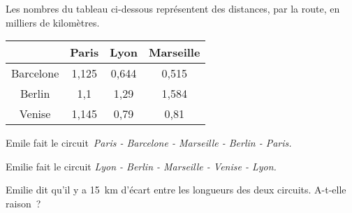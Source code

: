 Les nombres du tableau ci-dessous représentent des distances, par la
route, en milliers de kilomètres.
\begin{center}
  \begin{tabular}{|c|c|c|c|}
    \cline{2-4}
    \multicolumn{1}{c|}{}&Paris&Lyon&Marseille\\
    \hline
    Barcelone&1,125&0,644&0,515\\
    \hline
    Berlin&1,1&1,29&1,584\\
    \hline
    Venise&1,145&0,79&0,81\\
    \hline
  \end{tabular}
\end{center}
Emile fait le circuit {\em Paris - Barcelone - Marseille - Berlin -
Paris.}
\par Emilie fait le circuit {\em Lyon - Berlin - Marseille - Venise -
Lyon.}
\par Emilie dit qu'il y a 15~km d'écart entre les longueurs des deux
circuits.  A-t-elle raison ?